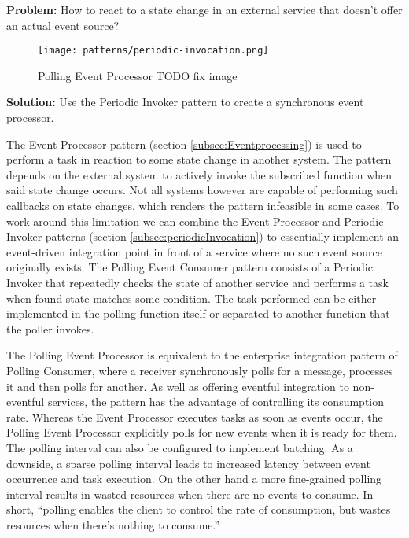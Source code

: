 \textbf{Problem:} How to react to a state change in an external service that doesn't offer an actual event source?

\begin{figure}[h]
  \centering
  \texttt{[image: patterns/periodic-invocation.png]}
  \caption{Polling Event Processor TODO fix image}
  \label{fig:PollingEventProcessor}
\end{figure}

\textbf{Solution:} Use the Periodic Invoker pattern to create a synchronous event processor.

The Event Processor pattern (section \ref{subsec:Eventprocessing}) is used to perform a task in reaction to some state change in another system. The pattern depends on the external system to actively invoke the subscribed function when said state change occurs. Not all systems however are capable of performing such callbacks on state changes, which renders the pattern infeasible in some cases. To work around this limitation we can combine the Event Processor and Periodic Invoker patterns (section \ref{subsec:periodicInvocation}) to essentially implement an event-driven integration point in front of a service where no such event source originally exists. The Polling Event Consumer pattern consists of a Periodic Invoker that repeatedly checks the state of another service and performs a task when found state matches some condition. The task performed can be either implemented in the polling function itself or separated to another function that the poller invokes.

The Polling Event Processor is equivalent to the enterprise integration pattern of Polling Consumer, where a receiver synchronously polls for a message, processes it and then polls for another. As well as offering eventful integration to non-eventful services, the pattern has the advantage of controlling its consumption rate. Whereas the Event Processor executes tasks as soon as events occur, the Polling Event Processor explicitly polls for new events when it is ready for them. The polling interval can also be configured to implement batching. As a downside, a sparse polling interval leads to increased latency between event occurrence and task execution. On the other hand a more fine-grained polling interval results in wasted resources when there are no events to consume. In short, ``polling enables the client to control the rate of consumption, but wastes resources when there’s nothing to consume.'' \parencite{hohpe2004enterprise}

